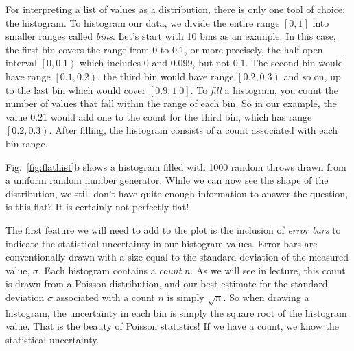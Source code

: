For interpreting a list of values as a distribution, there is only one
tool of choice: the histogram.  To histogram our data, we divide the
entire range $[0,1]$ into smaller ranges called {\em bins}.  Let's
start with 10 bins as an example. In this case, the first bin covers
the range from 0 to 0.1, or more precisely, the half-open interval
$\left[0,0.1\right)$ which includes $0$ and $0.099$, but not $0.1$.
  The second bin would have range $\left[0.1,0.2\right)$, the third
    bin would have range $\left[0.2,0.3\right)$ and so on, up to the
      last bin which would cover $\left[0.9,1.0\right]$.  To {\em
        fill} a histogram, you count the number of values that fall
      within the range of each bin.  So in our example, the value
      $0.21$ would add one to the count for the third bin, which has
      range $\left[0.2,0.3\right)$.  After filling, the histogram
        consists of a count associated with each bin range.

Fig.~\ref{fig:flathist}b shows a histogram filled with 1000 random
throws drawn from a uniform random number generator.  While we can now
see the shape of the distribution, we still don't have quite enough
information to answer the question, is this flat?  It is certainly not
perfectly flat!

The first feature we will need to add to the plot is the inclusion of
{\em error bars} to indicate the statistical uncertainty in our
histogram values.  Error bars are conventionally drawn with a size
equal to the standard deviation of the measured value, $\sigma$.  Each
histogram contains a {\em count} $n$.  As we will see in lecture, this
count is drawn from a Poisson distribution, and our best estimate for
the standard deviation $\sigma$ associated with a count $n$ is simply
$\sqrt{n}$.  So when drawing a histogram, the uncertainty in each bin
is simply the square root of the histogram value.  That is the beauty of
Poisson statistics!  If we have a count, we know the statistical
uncertainty.

